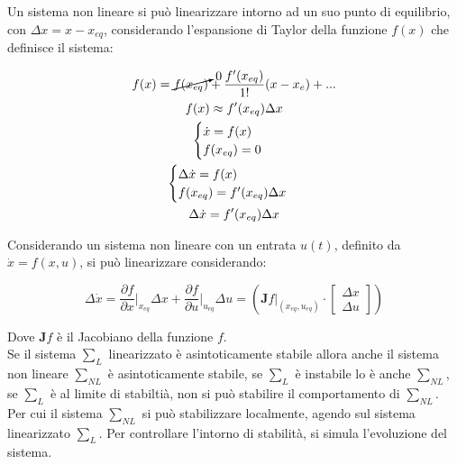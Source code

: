 \documentclass{article}
\numberwithin{equation}{subsection}
\begin{document}
Un sistema non lineare si può linearizzare intorno ad un suo punto di equilibrio, con $\Delta x=x-x_{eq}$, considerando l'espansione di Taylor della funzione $f(x)$ che 
definisce il sistema:

\begin{gather}
    f(x)=\cancelto{0}{f(x_{eq})}+\displaystyle\frac{f'(x_{eq})}{1!}{(x-x_e)}+...\\
    f(x)\approx f'(x_{eq})\Delta x\\
    \begin{cases}
        \dot x=f(x)\\
        f(x_{eq})=0
    \end{cases}\\
    \begin{cases}
        \Delta\dot x=f(x)\\
        f(x_{eq})=f'(x_{eq})\Delta x
    \end{cases}\\
    \Delta\dot x=f'(x_{eq})\Delta x
\end{gather}

Considerando un sistema non lineare con un entrata $u(t)$, definito da $\dot x=f(x,u)$, si può linearizzare considerando: 

\begin{equation}
    \Delta\dot x=\displaystyle\frac{\partial f}{\partial x}\bigg|_{x_{eq}}\Delta x+\frac{\partial f}{\partial u}\bigg|_{u_{eq}}\Delta u=\left(\mathbf{J}f\bigg|_{(x_{eq},u_{eq})}\cdot
    \begin{bmatrix}
        \Delta x\\
        \Delta u
    \end{bmatrix}
    \right)
\end{equation}

Dove $\mathbf{J}f$ è il Jacobiano della funzione $f$. \\

Se il sistema $\sum_L$ linearizzato è asintoticamente stabile allora anche il sistema non lineare $\sum_{NL}$ è asintoticamente stabile, se $\sum_L$ è instabile lo è 
anche $\sum_{NL}$, se $\sum_L$ è al limite di stabiltià, non si può stabilire il comportamento di $\sum_{NL}$. Per cui il sistema $\sum_{NL}$ si può stabilizzare 
localmente, agendo sul sistema linearizzato $\sum_L$. Per controllare l'intorno di stabilità, si simula l'evoluzione del sistema. 
\end{document}
